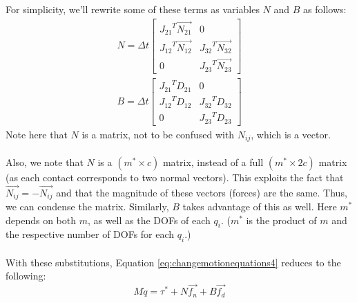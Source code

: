 {\begin{equation}
\end{equation}
For simplicity, we'll rewrite some of these terms as variables $N$ and $B$ as follows:
\begin{equation}
\label{eq:nbmatrix}
\begin{array}{cc}
N = \Delta{t}\left[\begin{matrix}{J_{21}}^T\vec{N_{21}} & 0 \\ {J_{12}}^T\vec{N_{12}} & {J_{32}}^T\vec{N_{32}} \\ 0 & {J_{23}}^T\vec{N_{23}} \end{matrix}\right] \\
B = \Delta{t}\left[\begin{matrix}{J_{21}}^TD_{21} & 0 \\ {J_{12}}^TD_{12} & {J_{32}}^TD_{32} \\ 0 & {J_{23}}^TD_{23} \end{matrix}\right]
\end{array}
\end{equation}
Note here that $N$ is a matrix, not to be confused with $N_{ij}$, which is a vector.
\\
\\
Also, we note that $N$ is a $(m^* \times c)$ matrix, instead of a full $(m^* \times 2c)$ matrix (as each contact corresponds to two normal vectors). This exploits the fact that $\vec{N_{ij}} = -\vec{N_{ij}}$ and that the magnitude of these vectors (forces) are the same. Thus, we can condense the matrix. Similarly, $B$ takes advantage of this as well. Here $m^*$ depends on both $m$, as well as the DOFs of each $q_i$. ($m^*$ is the product of $m$ and the respective number of DOFs for each $q_i$.)
\\
\\

With these substitutions, Equation \ref{eq:changemotionequations4} reduces to the following:
\begin{equation}
\label{eq:changemotionequations5}
M\dot{q} = \tau^* + N\vec{f_n} + B\vec{f_d}
\end{equation}
}